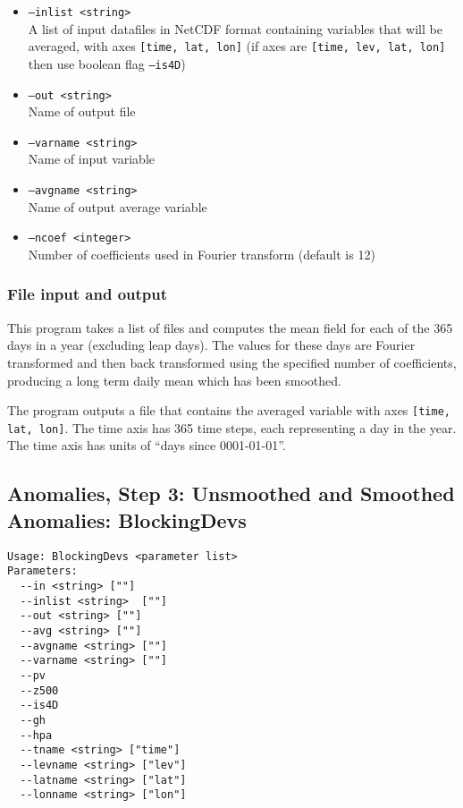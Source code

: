 \documentclass{article}
\begin{document}
\begin{itemize}
\item[]\texttt{--inlist <string>} \\ A list of input datafiles in NetCDF format containing variables that will be averaged, with axes \texttt{[time, lat, lon]} (if axes are \texttt{[time, lev, lat, lon] } then use boolean flag \texttt{--is4D})
\item[]\texttt{--out <string>} \\ Name of output file
\item[]\texttt{--varname <string>} \\ Name of input variable
\item[]\texttt{--avgname <string>} \\ Name of output average variable
\item[]\texttt{--ncoef <integer>} \\ Number of coefficients used in Fourier transform (default is 12)
\end{itemize}

\subsubsection{File input and output}
This program takes a list of files and computes the mean field for each of the 365 days in a year (excluding leap days). The values for these days are Fourier transformed and then back transformed using the specified number of coefficients, producing a long term daily mean which has been smoothed.

The program outputs a file that contains the averaged variable with axes \texttt{[time, lat, lon]}. The time axis has 365 time steps, each representing a day in the year. The time axis has units of ``days since 0001-01-01''.

\subsection{Anomalies, Step 3: Unsmoothed and Smoothed Anomalies: BlockingDevs}\label{dev}
\begin{verbatim}
Usage: BlockingDevs <parameter list>
Parameters:
  --in <string> [""]
  --inlist <string>  [""]
  --out <string> [""]
  --avg <string> [""]
  --avgname <string> [""]
  --varname <string> [""]
  --pv
  --z500
  --is4D
  --gh
  --hpa
  --tname <string> ["time"]
  --levname <string> ["lev"]
  --latname <string> ["lat"]
  --lonname <string> ["lon"]
\end{verbatim}
\end{document}
